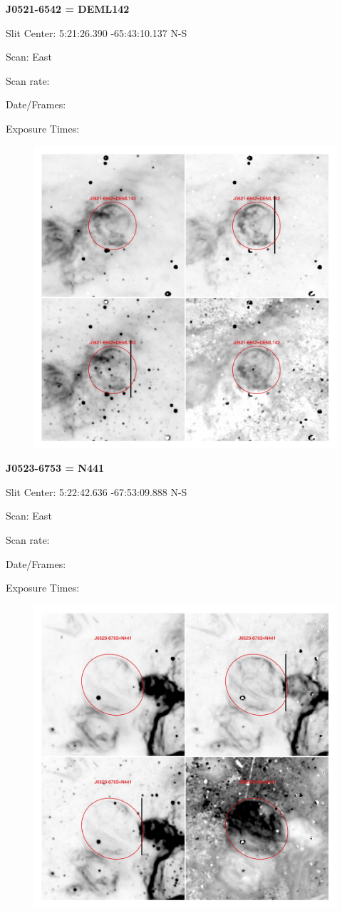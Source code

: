 \documentclass[11pt]{article}
\begin{document}
\newpage
{\bf J0521-6542 = DEML142}  
 
Slit Center:   5:21:26.390   -65:43:10.137   N-S

Scan:  East

Scan rate:  

Date/Frames:

Exposure Times:  

\begin{figure}
\includegraphics[width=11.cm]{snapshots/J0521-6542.png}
\end{figure}

\newpage
{\bf J0523-6753 = N441}  
 
Slit Center:   5:22:42.636  -67:53:09.888 N-S

Scan:  East

Scan rate:  

Date/Frames:

Exposure Times:  

\begin{figure}
\includegraphics[width=11.cm]{snapshots/J0523-6753.png}
\end{figure}
\end{document}
